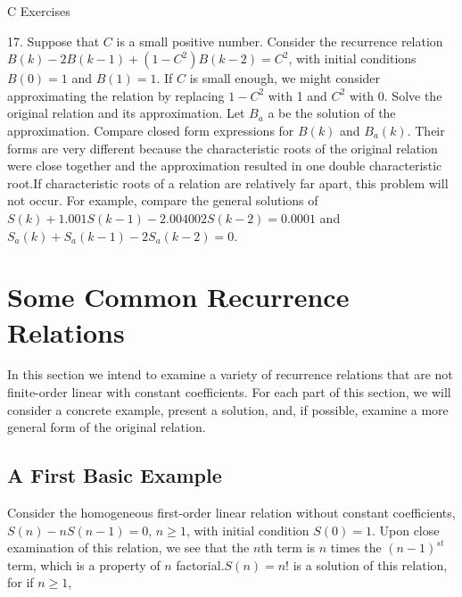 \documentclass[10pt,]{book}
\theoremstyle{plain}
\theoremstyle{definition}
\theoremstyle{definition}
\theoremstyle{definition}
\theoremstyle{definition}
\numberwithin{equation}{section}
\begin{document}
\par\smallskip\noindent
\hypertarget{exercisegroup-7}{}\typeout{************************************************}
\typeout{************************************************}
C Exercises%
\begin{exercisegroup}
\item[17.]\hypertarget{exercise-28}{}Suppose that \(C\) is a small positive number. Consider the recurrence relation \(B(k) - 2B(k - 1) + \left(1 - C ^2\right)B(k - 2)
= C^2\), with initial conditions \(B(0) = 1\) and \(B(1) = 1\). If \(C\) is small enough, we might consider approximating the relation by replacing
\(1 - C^2\) with 1 and \(C^2\) with 0. Solve the original relation and its approximation. Let \(B_a\) a be the solution of the approximation. Compare
closed form expressions for \(B(k)\) and \(B_a(k)\). Their forms are very different because the characteristic roots of the original relation were
close together and the approximation resulted in one double characteristic root.If characteristic roots of a relation
are relatively far apart, this problem will not occur. For example, compare the general solutions of 
\(\quad\)\(S(k) + 1.001S(k - 1) - 2.004002S(k - 2) = 0.0001\) and
\(\quad\)\(S_a(k) + S_a(k - 1) - 2S_a(k - 2) = 0\).%
\par\smallskip
\end{exercisegroup}
\par\smallskip\noindent
\typeout{************************************************}
\typeout{************************************************}
\section[Some Common Recurrence Relations]{Some Common Recurrence Relations}\label{s-some-common-rrs}
\typeout{************************************************}
\typeout{************************************************}
In this section we intend to examine a variety of recurrence relations that are not finite-order linear with constant coefficients. For each part of this section, we will consider a concrete example, present a solution, and, if possible, examine a more general form of the original relation.%
\typeout{************************************************}
\typeout{************************************************}
\subsection[A  First Basic Example]{A  First Basic Example}\label{rr-basic-example}
 Consider the homogeneous first-order linear relation without constant coefficients,  \(S(n) - n S(n - 1) = 0\), \(n \geq  1\), with initial condition \(S(0)
= 1\). Upon close examination of this relation, we see that the \(n\)th term is \(n\) times the \((n - 1)^{st}\) term, which is a property of \(n\) factorial.\(S(n) = n!\) is a solution of this relation, for if \(n \geq  1\),
\end{document}
